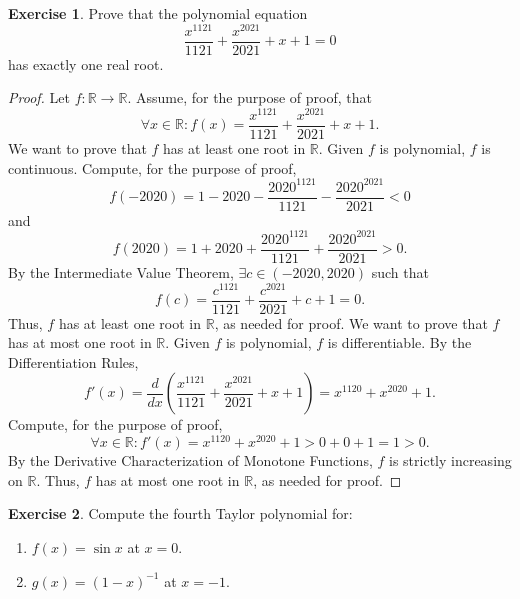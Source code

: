 \documentclass[12pt]{article}
\theoremstyle{definition}
\newtheorem{exercise}{Exercise}
\begin{document}
\thispagestyle{firstpage}

\begin{exercise}
    Prove that the polynomial equation
    \[
        \frac{x^{1121}}{1121} + \frac{x^{2021}}{2021} + x + 1 = 0
    \]
    has exactly one real root.
\end{exercise}

\begin{proof}
    Let \(f : \mathbb{R} \to \mathbb{R}\). Assume, for the purpose of proof, that
    \[
        \forall x \in \mathbb{R} : f(x) = \frac{x^{1121}}{1121} + \frac{x^{2021}}{2021} + x + 1.
    \]
    We want to prove that \(f\) has at least one root in \(\mathbb{R}\). Given \(f\) is polynomial, \(f\) is continuous. Compute, for the purpose of proof,
    \[
        f(-2020) = 1 - 2020 - \frac{2020^{1121}}{1121} - \frac{2020^{2021}}{2021} < 0
    \]
    and 
    \[
        f(2020) = 1 + 2020 + \frac{2020^{1121}}{1121} + \frac{2020^{2021}}{2021} > 0. 
    \]
    By the Intermediate Value Theorem, \(\exists c \in (-2020, 2020)\) such that
    \[
        f(c) = \frac{c^{1121}}{1121} + \frac{c^{2021}}{2021} + c + 1 = 0.
    \]
    Thus, \(f\) has at least one root in \(\mathbb{R}\), as needed for proof. We want to prove that \(f\) has at most one root in \(\mathbb{R}\). Given \(f\) is polynomial, \(f\) is differentiable. By the Differentiation Rules,
    \[
        f'(x) = \frac{d}{dx}\left(\frac{x^{1121}}{1121} + \frac{x^{2021}}{2021} + x + 1\right) = x^{1120} + x^{2020} + 1.
    \]
    Compute, for the purpose of proof,
    \[
        \forall x \in \mathbb{R} : f'(x) = x^{1120} + x^{2020} + 1 > 0 + 0 + 1 = 1 > 0.
    \]
    By the Derivative Characterization of Monotone Functions, \(f\) is strictly increasing on \(\mathbb{R}\). Thus, \(f\) has at most one root in \(\mathbb{R}\), as needed for proof.
\end{proof}

\begin{exercise}
    Compute the fourth Taylor polynomial for:
    \begin{enumerate}[label=(\alph*)]
        \item \(f(x) = \sin x\) at \(x = 0\).
        \item \(g(x) = (1 - x)^{-1}\) at \(x = -1\).
    \end{enumerate}
\end{exercise}
\end{document}
